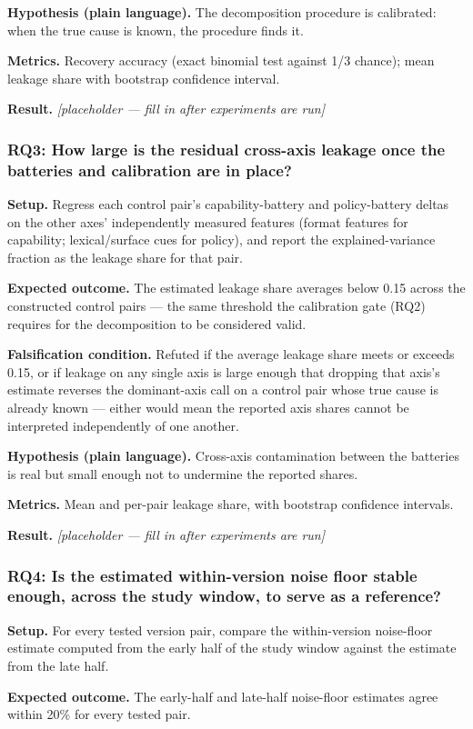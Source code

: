\documentclass[11pt]{article}
\newcommand{\ph}{\textit{[placeholder --- fill in after experiments are run]}}
\begin{document}
\textbf{Hypothesis (plain language).} The decomposition procedure is calibrated: when the true cause is known, the procedure finds it.

\textbf{Metrics.} Recovery accuracy (exact binomial test against 1/3 chance); mean leakage share with bootstrap confidence interval.

\textbf{Result.} \ph

\subsubsection{RQ3: How large is the residual cross-axis leakage once the batteries and calibration are in place?}
\textbf{Setup.} Regress each control pair's capability-battery and policy-battery deltas on the other axes' independently measured features (format features for capability; lexical/surface cues for policy), and report the explained-variance fraction as the leakage share for that pair.

\textbf{Expected outcome.} The estimated leakage share averages below 0.15 across the constructed control pairs --- the same threshold the calibration gate (RQ2) requires for the decomposition to be considered valid.

\textbf{Falsification condition.} Refuted if the average leakage share meets or exceeds 0.15, or if leakage on any single axis is large enough that dropping that axis's estimate reverses the dominant-axis call on a control pair whose true cause is already known --- either would mean the reported axis shares cannot be interpreted independently of one another.

\textbf{Hypothesis (plain language).} Cross-axis contamination between the batteries is real but small enough not to undermine the reported shares.

\textbf{Metrics.} Mean and per-pair leakage share, with bootstrap confidence intervals.

\textbf{Result.} \ph

\subsubsection{RQ4: Is the estimated within-version noise floor stable enough, across the study window, to serve as a reference?}
\textbf{Setup.} For every tested version pair, compare the within-version noise-floor estimate computed from the early half of the study window against the estimate from the late half.

\textbf{Expected outcome.} The early-half and late-half noise-floor estimates agree within 20\% for every tested pair.
\end{document}
